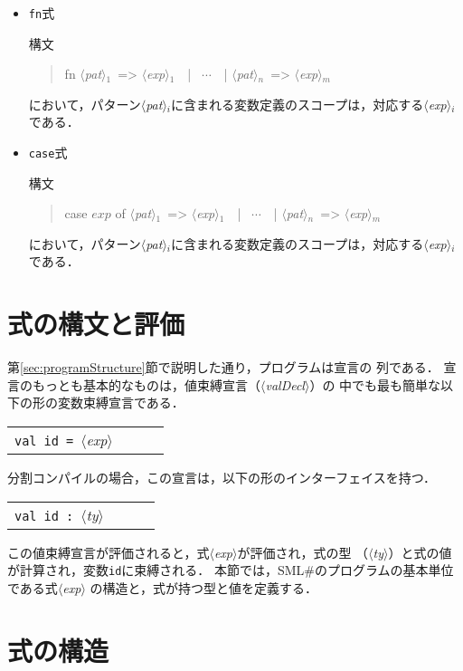 \documentclass{jbook}
\newif\ifjp
\newcommand{\txt}[2]{#1}
\newcommand{\smlsharp}{SML\#}
\newcommand{\code}[1]{\mbox{\large\tt #1}}
\newcommand{\nonterm}[1]{\mbox{$\langle$}{\it #1}\mbox{$\rangle$}}
\newcommand{\term}[1]{\mbox{{\tt #1}}}
\newenvironment{program}{\begin{quote}\begin{tt}}%
                        {\end{tt}\end{quote}}
\begin{document}
\begin{itemize}
\item \code{fn}式

構文
\begin{program}
fn \nonterm{pat}$_1$\  => \nonterm{exp}$_1$\ \ | \ $\cdots$\ \ | \nonterm{pat}$_n$\  => \nonterm{exp}$_m$
\end{program}
において，パターン\nonterm{pat}$_{i}$に含まれる変数定義のスコープは，対応する\nonterm{exp}$_i$である．

\item \code{case}式

構文
\begin{program}
case $exp$ of \nonterm{pat}$_1$\  => \nonterm{exp}$_1$\ \ | \ $\cdots$\ \ | \nonterm{pat}$_n$\  => \nonterm{exp}$_m$
\end{program}
において，パターン\nonterm{pat}$_{i}$に含まれる変数定義のスコープは，対応する\nonterm{exp}$_i$である．
\end{itemize}

\chapter{\txt{式の構文と評価}{}}
\label{sce:expressionsAndPatterns}
\ifjp%
	第\ref{sec:programStructure}節で説明した通り，プログラムは宣言の
列である．
	宣言のもっとも基本的なものは，値束縛宣言（\nonterm{valDecl}）の
中でも最も簡単な以下の形の変数束縛宣言である．

\begin{center}
\begin{tabular}{lcll}
\term{val}\ \term{id}\ \term{=}\ \nonterm{exp}
\end{tabular}
\end{center}

	分割コンパイルの場合，この宣言は，以下の形のインターフェイスを持つ．

\begin{center}
\begin{tabular}{lcll}
\term{val}\ \term{id}\ \term{:}\ \nonterm{ty}
\end{tabular}
\end{center}

	この値束縛宣言が評価されると，式\nonterm{exp}が評価され，式の型
（\nonterm{ty}）と式の値が計算され，変数\term{id}に束縛される．
	本節では，\smlsharp{}のプログラムの基本単位である式\nonterm{exp}
の構造と，式が持つ型と値を定義する．

\chapter{\txt{式の構造}{}}
\label{sec:expSyntax}
\end{document}
